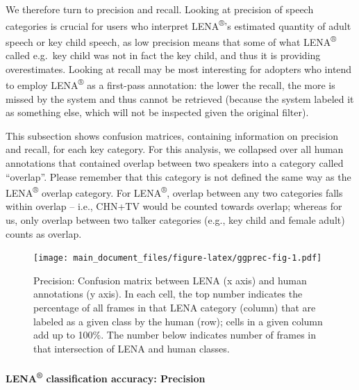 \documentclass[english,table,man,floatsintext]{apa6}
\let\oldparagraph\paragraph
\renewcommand{\paragraph}[1]{\oldparagraph{#1}\mbox{}}
\begin{document}
We therefore turn to precision and recall. Looking at precision of speech categories is crucial for users who interpret LENA\textsuperscript{®}'s estimated quantity of adult speech or key child speech, as low precision means that some of what LENA\textsuperscript{®} called e.g.~key child was not in fact the key child, and thus it is providing overestimates. Looking at recall may be most interesting for adopters who intend to employ LENA\textsuperscript{®} as a first-pass annotation: the lower the recall, the more is missed by the system and thus cannot be retrieved (because the system labeled it as something else, which will not be inspected given the original filter).

This subsection shows confusion matrices, containing information on precision and recall, for each key category. For this analysis, we collapsed over all human annotations that contained overlap between two speakers into a category called \enquote{overlap}. Please remember that this category is not defined the same way as the LENA\textsuperscript{®} overlap category. For LENA\textsuperscript{®}, overlap between any two categories falls within overlap -- i.e., CHN+TV would be counted towards overlap; whereas for us, only overlap between two talker categories (e.g., key child and female adult) counts as overlap.

\begin{figure}
\centering
\texttt{[image: main\_document\_files/figure-latex/ggprec-fig-1.pdf]}
\caption{\label{fig:ggprec-fig}Precision: Confusion matrix between LENA (x axis) and human annotations (y axis). In each cell, the top number indicates the percentage of all frames in that LENA category (column) that are labeled as a given class by the human (row); cells in a given column add up to 100\%. The number below indicates number of frames in that intersection of LENA and human classes.}
\end{figure}

\hypertarget{lena-classification-accuracy-precision}{%
\paragraph{\texorpdfstring{LENA\textsuperscript{®} classification accuracy: Precision}{LENA® classification accuracy: Precision}}\label{lena-classification-accuracy-precision}}
\end{document}
